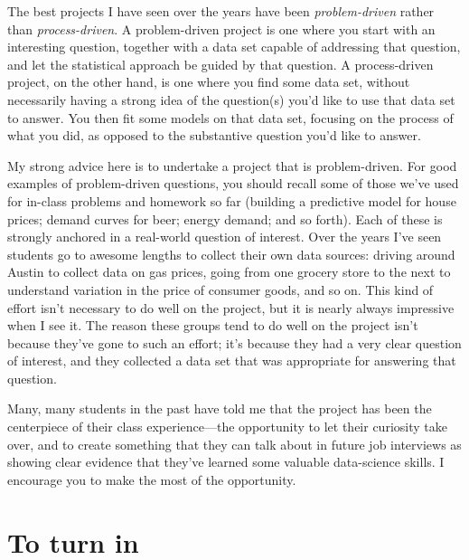 \documentclass{mynotes}
\begin{document}
The best projects I have seen over the years have been \textit{problem-driven} rather than \textit{process-driven}.  A problem-driven project is one where you start with an interesting question, together with a data set capable of addressing that question, and let the statistical approach be guided by that question.  A process-driven project, on the other hand, is one where you find some data set, without necessarily having a strong idea of the question(s) you'd like to use that data set to answer.  You then fit some models on that data set, focusing on the process of what you did, as opposed to the substantive question you'd like to answer.

My strong advice here is to undertake a project that is problem-driven.  For good examples of problem-driven questions, you should recall some of those we've used for in-class problems and homework so far (building a predictive model for house prices; demand curves for beer; energy demand; and so forth).  Each of these is strongly anchored in a real-world question of interest.  Over the years I've seen students go to awesome lengths to collect their own data sources: driving around Austin to collect data on gas prices, going from one grocery store to the next to understand variation in the price of consumer goods, and so on.  This kind of effort isn't necessary to do well on the project, but it is nearly always impressive when I see it.  The reason these groups tend to do well on the project isn't because they've gone to such an effort; it's because they had a very clear question of interest, and they collected a data set that was appropriate for answering that question.

Many, many students in the past have told me that the project has been the centerpiece of their class experience---the opportunity to let their curiosity take over, and to create something that they can talk about in future job interviews as showing clear evidence that they've learned some valuable data-science skills.  I encourage you to make the most of the opportunity.

\section{To turn in}
\end{document}
